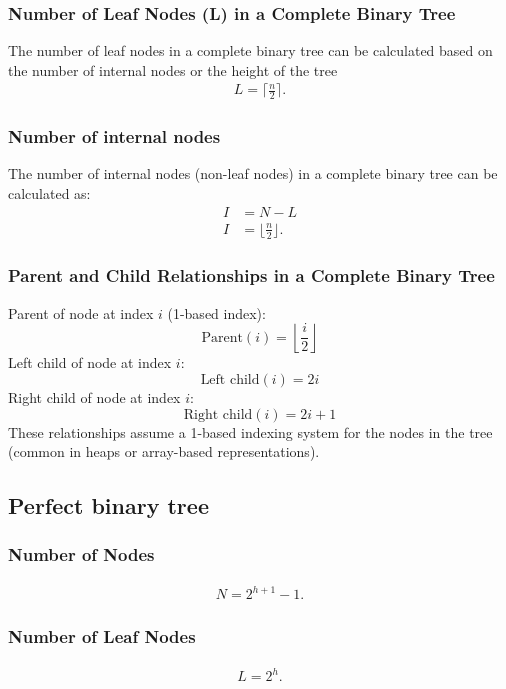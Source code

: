 \documentclass{report}
\begin{document}
\bigbreak \noindent 
\subsubsection{Number of Leaf Nodes (L) in a Complete Binary Tree}
\bigbreak \noindent 
The number of leaf nodes in a complete binary tree can be calculated based on the number of internal nodes or the height of the tree
\begin{align*}
    L = \lceil \frac{n}{2} \rceil
.\end{align*}
\bigbreak \noindent 
\subsubsection{Number of internal nodes}
\bigbreak \noindent 
The number of internal nodes (non-leaf nodes) in a complete binary tree can be calculated as:
\begin{align*}
    I &= N - L \\
    I &= \lfloor \frac{n}{2} \rfloor
.\end{align*}

\bigbreak \noindent 
\subsubsection{Parent and Child Relationships in a Complete Binary Tree}
\bigbreak \noindent 
Parent of node at index $i$ (1-based index):
\[
\text{Parent}(i) = \left\lfloor \frac{i}{2} \right\rfloor
\]
Left child of node at index $i$:
\[
\text{Left child}(i) = 2i
\]
Right child of node at index $i$:
\[
\text{Right child}(i) = 2i + 1
\]
These relationships assume a 1-based indexing system for the nodes in the tree (common in heaps or array-based representations).

\pagebreak 
\subsection{Perfect binary tree}
\bigbreak \noindent 
\subsubsection{Number of Nodes}
\bigbreak \noindent 
\begin{align*}
    N = 2^{h+1} - 1
.\end{align*}

\bigbreak \noindent 
\subsubsection{Number of Leaf Nodes}
\bigbreak \noindent 
\begin{align*}
 L = 2^h
.\end{align*}
\end{document}
